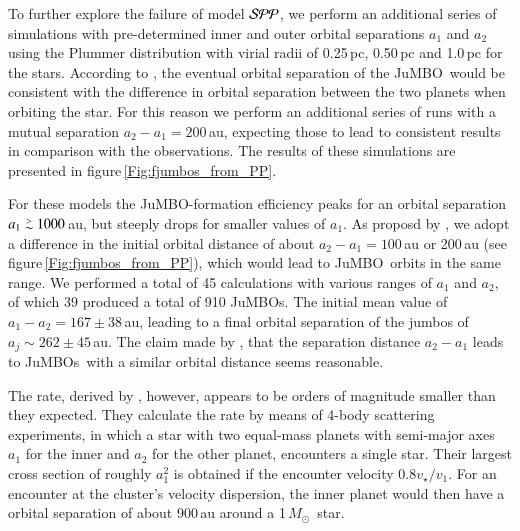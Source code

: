 \documentclass[aa]{lib/aa}
\newcommand{\MSun}{\mbox{${M}_\odot$}}
\def\apgt{\ {\raise-.5ex\hbox{$\buildrel>\over\sim$}}\ }
\newcommand{\jumbo}{\mbox{JuMBO}}
\newcommand{\jumbos}{\mbox{JuMBOs}}
\begin{document}
To further explore the failure of model ${\cal SPP}$, we perform an
additional series of simulations with pre-determined inner and outer
orbital separations $a_1$ and $a_2$ using the Plummer distribution
with virial radii of 0.25\,pc, 0.50\,pc and 1.0\,pc for the stars.
According to \cite{2023arXiv231006016W}, the eventual orbital
separation of the \jumbo\, would be consistent with the difference in
orbital separation between the two planets when orbiting the star. For
this reason we perform an additional series of runs with a mutual
separation $a_2-a_1 = 200$\,au, expecting those to lead to consistent
results in comparison with the observations.  The results of these
simulations are presented in figure\,\ref{Fig:fjumbos_from_PP}.

For these models the \jumbo-formation efficiency peaks for an orbital
separation $a_1 \apgt 1000$\,au, but steeply drops for smaller values
of $a_1$. As proposd by \cite{2023arXiv231006016W}, we adopt a
difference in the initial orbital distance of about $a_2-a_1 =
100$\,au or 200\,au (see figure\,\ref{Fig:fjumbos_from_PP}), which
would lead to \jumbo\, orbits in the same range.  We performed a total
of 45 calculations with various ranges of $a_1$ and $a_2$, of which 39
produced a total of 910 \jumbos. The initial mean value of $a_1-a_2 =
167\pm38$\,au, leading to a final orbital separation of the jumbos of
$a_j \sim 262\pm45$\,au.  The claim made by
\cite{2023arXiv231006016W}, that the separation distance $a_2-a_1$
leads to \jumbos\, with a similar orbital distance seems reasonable.

The rate, derived by \cite{2023arXiv231006016W}, however, appears to
be orders of magnitude smaller than they expected.  They calculate the
rate by means of 4-body scattering experiments, in which a star with
two equal-mass planets with semi-major axes $a_1$ for the inner and
$a_2$ for the other planet, encounters a single star. Their largest
cross section of roughly $a_1^2$ is obtained if the encounter velocity
$0.8v_\star/v_1$. For an encounter at the cluster's velocity
dispersion, the inner planet would then have a orbital separation of
about 900\,au around a 1\,\MSun\, star.
\end{document}
